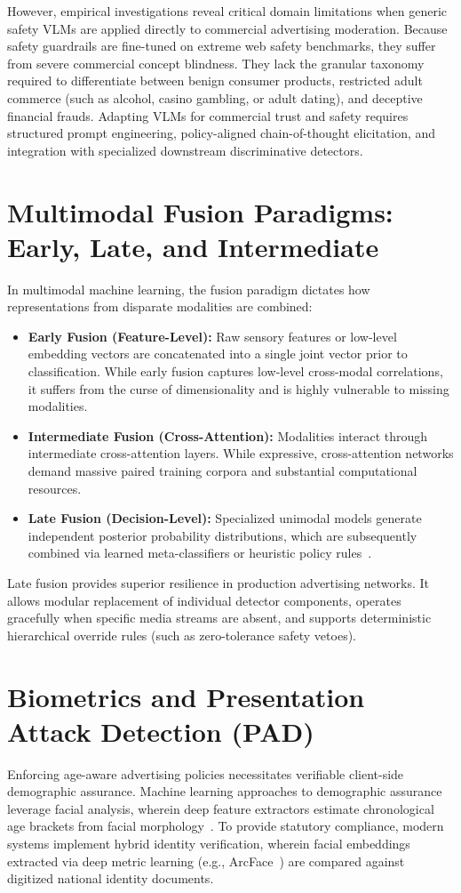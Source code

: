 \documentclass[12pt,a4paper]{report}
\begin{document}
However, empirical investigations reveal critical domain limitations when generic safety VLMs are applied directly to commercial advertising moderation. Because safety guardrails are fine-tuned on extreme web safety benchmarks, they suffer from severe commercial concept blindness. They lack the granular taxonomy required to differentiate between benign consumer products, restricted adult commerce (such as alcohol, casino gambling, or adult dating), and deceptive financial frauds. Adapting VLMs for commercial trust and safety requires structured prompt engineering, policy-aligned chain-of-thought elicitation, and integration with specialized downstream discriminative detectors.

\section{Multimodal Fusion Paradigms: Early, Late, and Intermediate}
In multimodal machine learning, the fusion paradigm dictates how representations from disparate modalities are combined:
\begin{itemize}
    \item \textbf{Early Fusion (Feature-Level):} Raw sensory features or low-level embedding vectors are concatenated into a single joint vector prior to classification. While early fusion captures low-level cross-modal correlations, it suffers from the curse of dimensionality and is highly vulnerable to missing modalities.
    \item \textbf{Intermediate Fusion (Cross-Attention):} Modalities interact through intermediate cross-attention layers. While expressive, cross-attention networks demand massive paired training corpora and substantial computational resources.
    \item \textbf{Late Fusion (Decision-Level):} Specialized unimodal models generate independent posterior probability distributions, which are subsequently combined via learned meta-classifiers or heuristic policy rules~\cite{gadzicki2020review}.
\end{itemize}

Late fusion provides superior resilience in production advertising networks. It allows modular replacement of individual detector components, operates gracefully when specific media streams are absent, and supports deterministic hierarchical override rules (such as zero-tolerance safety vetoes).

\section{Biometrics and Presentation Attack Detection (PAD)}
Enforcing age-aware advertising policies necessitates verifiable client-side demographic assurance. Machine learning approaches to demographic assurance leverage facial analysis, wherein deep feature extractors estimate chronological age brackets from facial morphology~\cite{rothe2018dex}. To provide statutory compliance, modern systems implement hybrid identity verification, wherein facial embeddings extracted via deep metric learning (e.g., ArcFace~\cite{deng2019arcface}) are compared against digitized national identity documents.
\end{document}
